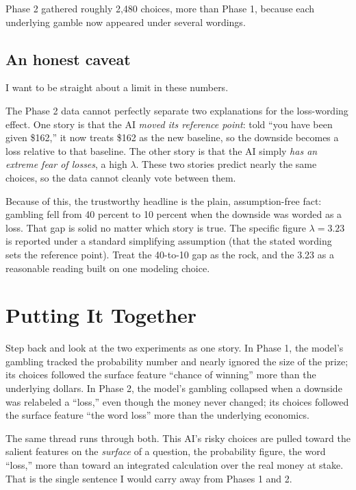 \documentclass[11pt]{article}
\begin{document}
Phase 2 gathered roughly 2,480 choices, more than Phase 1, because each underlying gamble now appeared
under several wordings.

\subsection{An honest caveat}

I want to be straight about a limit in these numbers.

\begin{asidebox}
The Phase 2 data cannot perfectly separate two explanations for the loss-wording effect. One story is
that the AI \emph{moved its reference point}: told ``you have been given \$162,'' it now treats \$162 as
the new baseline, so the downside becomes a loss relative to that baseline. The other story is that the
AI simply \emph{has an extreme fear of losses}, a high $\lambda$. These two stories predict nearly the
same choices, so the data cannot cleanly vote between them.

\smallskip
Because of this, the trustworthy headline is the plain, assumption-free fact: gambling fell from 40
percent to 10 percent when the downside was worded as a loss. That gap is solid no matter which story is
true. The specific figure $\lambda = 3.23$ is reported under a standard simplifying assumption (that the
stated wording sets the reference point). Treat the 40-to-10 gap as the rock, and the 3.23 as a
reasonable reading built on one modeling choice.
\end{asidebox}

\section{Putting It Together}

Step back and look at the two experiments as one story. In Phase 1, the model's gambling tracked the
probability number and nearly ignored the size of the prize; its choices followed the surface feature
``chance of winning'' more than the underlying dollars. In Phase 2, the model's gambling collapsed when
a downside was relabeled a ``loss,'' even though the money never changed; its choices followed the
surface feature ``the word loss'' more than the underlying economics.

The same thread runs through both. This AI's risky choices are pulled toward the salient features on
the \emph{surface} of a question, the probability figure, the word ``loss,'' more than toward an
integrated calculation over the real money at stake. That is the single sentence I would carry away from
Phases 1 and 2.
\end{document}
